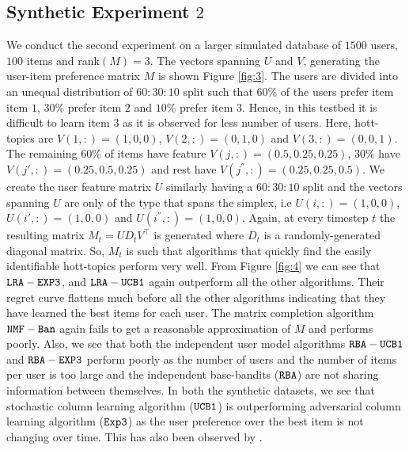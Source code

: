 \subsection{Synthetic Experiment $2$}
We conduct the second experiment on a larger simulated database of $1500$ users, $100$ items and rank$(M)=3$. The vectors spanning $U$ and $V$, generating the user-item preference matrix $M$ is shown Figure \ref{fig:3}. The users are divided into an unequal distribution of $60:30:10$ split such that $60\%$ of the users prefer item item $1$, $30\%$ prefer item $2$ and $10\%$ prefer item $3$. Hence, in this testbed it is difficult to learn item $3$ as it is observed for less number of users. Here, hott-topics are $V(1,:) = (1,0,0)$, $V(2,:) = (0,1, 0)$ and $V(3,:) = (0,0,1)$. The remaining $60\%$ of items have feature  $V(j,:) = (0.5, 0.25,0.25)$, $30\%$ have $V(j',:) = (0.25, 0.5, 0.25)$ and rest have $V(j^{''},:) = (0.25, 0.25, 0.5)$. We create the user feature matrix $U$ similarly having a $60:30:10$ split and the vectors spanning $U$ are only of the type that spans the simplex, i.e $U(i,:)=(1,0,0)$, $U(i',:)=(1,0,0)$ and $U(i^{''},:)=(1,0,0)$. Again, at every timestep $t$ the resulting matrix $M_t =UD_tV^{\intercal}$ is generated where $D_t$ is a randomly-generated diagonal matrix. So, $M_t$ is  such that algorithms that quickly find the easily identifiable hott-topics perform very well. From Figure \ref{fig:4} we can see that ${\tt LRA-EXP3}$, and ${\tt LRA-UCB1}$ again outperform all the other algorithms. Their regret curve flattens much before all the other algorithms indicating that they have learned the best items for each user. The matrix completion algorithm ${\tt NMF-Ban}$ again fails to get a reasonable approximation of $M$ and performs poorly. Also, we see that both the independent user model algorithms ${\tt RBA-UCB1}$ and ${\tt RBA-EXP3}$ perform poorly as the number of users and the number of items per user is too large and the independent base-bandits (${\tt RBA}$) are not sharing information between themselves. In both the synthetic datasets, we see that stochastic column learning algorithm (${\tt UCB1}$) is outperforming adversarial column learning algorithm (${\tt Exp3}$) as the user preference over the best item is not changing over time. This has also been observed by \citet{radlinski2008learning}.



